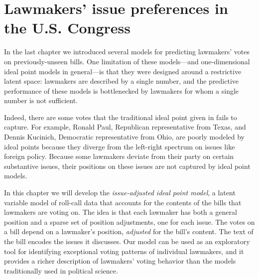 \chapter{Lawmakers' issue preferences in the U.S. Congress}
\label{chapter:issue_adjustments}

In the last chapter we introduced several models for predicting lawmakers' votes on previously-unseen bills.  One limitation of these models---and one-dimensional ideal point models in general---is that they were designed around a restrictive latent space: lawmakers are described by a single number, and the predictive performance of these models is bottlenecked by lawmakers for whom a single number is not sufficient.

Indeed, there are some votes that the traditional ideal point given in
 fails to capture.  For example, Ronald Paul, Republican representative from Texas, and Dennis Kucinich, Democratic representative from Ohio, are poorly modeled by ideal points because they diverge from the left-right spectrum on issues like foreign policy. Because some lawmakers deviate from their party on certain substantive issues, their positions on these issues are not captured by ideal point models.

%



In this chapter we will develop the \emph{issue-adjusted ideal point model}, a latent variable model of roll-call data that accounts for the contents of the bills that lawmakers are voting on.  The idea is that each lawmaker has both a general position and a sparse set of position adjustments, one for each issue.  The votes on a bill depend on a lawmaker's position, \emph{adjusted} for the bill's content.  The text of the bill encodes the issues it discusses. Our model can be used as an exploratory tool for identifying exceptional voting patterns of individual lawmakers, and it provides a richer description of lawmakers' voting behavior than the models traditionally used in political science.

